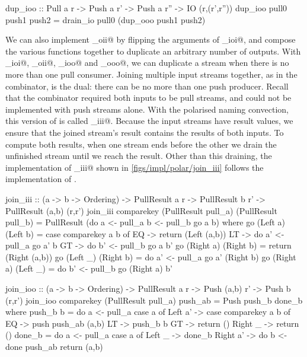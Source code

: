 \begin{haskell}
dup_ioo :: Pull a r -> Push a r' -> Push a r'' -> IO (r,(r',r''))
dup_ioo pull0 push1 push2 = drain_io pull0 (dup_ooo push1 push2)
\end{haskell}

We can also implement \Hs@dup_oii@ by flipping the arguments of \Hs@dup_ioi@, and compose the various \Hs@dup@ functions together to duplicate an arbitrary number of outputs.
With \Hs@dup_ioi@, \Hs@dup_oii@, \Hs@dup_ioo@ and \Hs@dup_ooo@, we can duplicate a stream when there is no more than one pull consumer.
Joining multiple input streams together, as in the \Hs@join@ combinator, is the dual: there can be no more than one push producer.
Recall that the \Hs@join@ combinator required both inputs to be pull streams, and could not be implemented with push streams alone.
With the polarised naming convection, this version of \Hs@join@ is called \Hs@join_iii@.
Because the input streams have result values, we ensure that the joined stream's result contains the results of both inputs.
To compute both results, when one stream ends before the other we drain the unfinished stream until we reach the result.
Other than this draining, the implementation of \Hs@join_iii@ shown in \cref{figs/impl/polar/join_iii} follows the implementation of \Hs@join@.

\begin{haskell}[float,caption=Polarised implementation of \Hs/join_iii/,label=figs/impl/polar/join_iii]
join_iii :: (a -> b -> Ordering) -> PullResult a r
         -> PullResult b r'      -> PullResult (a,b) (r,r')
join_iii comparekey (PullResult pull_a) (PullResult pull_b) = PullResult (do
   a <- pull_a
   b <- pull_b
   go a b)
 where
  go (Left a) (Left b)
   = case comparekey a b of
      EQ -> return (Left (a,b))
      LT -> do
        a' <- pull_a
        go a' b
      GT -> do
        b' <- pull_b
        go a b'
  go (Right a) (Right b) = return (Right (a,b))
  go (Left _) (Right b) = do
    a' <- pull_a
    go a' (Right b)
  go (Right a) (Left _) = do
    b' <- pull_b
    go (Right a) b'
\end{haskell}

\begin{haskell}[float,caption=Polarised implementation of \Hs/join_ioo/,label=figs/impl/polar/join_ioo]
join_ioo :: (a -> b -> Ordering) -> PullResult a r
         -> Push (a,b) r'        -> Push b (r,r')
join_ioo comparekey (PullResult pull_a) push_ab = Push push_b done_b
 where
  push_b b = do
    a <- pull_a
    case a of
     Left a' -> case comparekey a b of
      EQ     -> push push_ab (a,b)
      LT     -> push_b b
      GT     -> return ()
     Right _ -> return () 
  done_b = do
    a <- pull_a
    case a of
     Left _   -> done_b
     Right a' -> do
      b <- done push_ab
      return (a,b)
\end{haskell}


